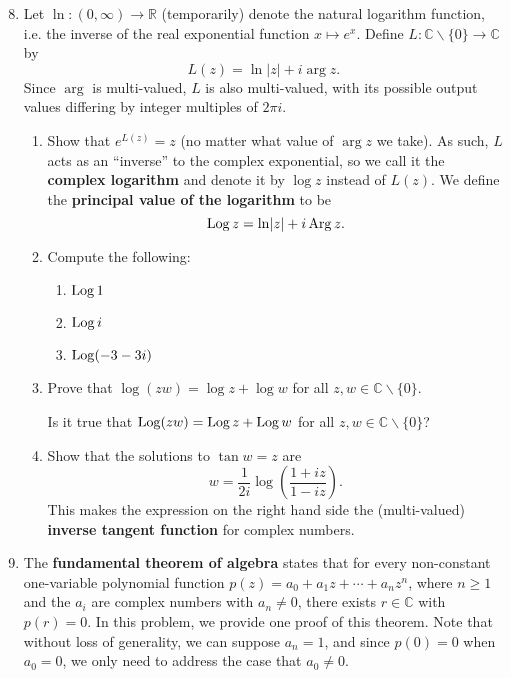 \begin{enumerate}\setcounter{enumi}{7}
\item Let $\ln:(0,\infty)\to\mathbb{R}$ (temporarily) denote the natural logarithm function, i.e. the inverse of the real exponential function $x\mapsto e^x$. Define $L:\mathbb{C}\backslash\{0\}\to\mathbb{C}$ by
\begin{equation*}
L(z) = \ln\lvert z\rvert + i\arg z.
\end{equation*}
Since $\arg$ is multi-valued, $L$ is also multi-valued, with its possible output values differing by integer multiples of $2\pi i$.
\begin{enumerate}
\item Show that $e^{L(z)} = z$ (no matter what value of $\arg z$ we take). As such, $L$ acts as an ``inverse'' to the complex exponential, so we call it the \textbf{complex logarithm} and denote it by $\log z$ instead of $L(z)$. We define the \textbf{principal value of the logarithm} to be
\begin{equation*}
\operatorname{Log} z = \ln\lvert z\rvert + i\operatorname{Arg} z.
\end{equation*}
\item Compute the following:
\begin{enumerate}
\item $\operatorname{Log} 1$
\item $\operatorname{Log} i$
\item $\operatorname{Log} (-3 - 3i)$
\end{enumerate}
\item Prove that $\log(zw) = \log z + \log w$ for all $z,w\in\mathbb{C}\backslash\{0\}$.\par
Is it true that $\operatorname{Log}(zw) = \operatorname{Log} z + \operatorname{Log} w$ for all $z,w\in\mathbb{C}\backslash\{0\}$?
\item Show that the solutions to $\tan w = z$ are
\begin{equation*}
w = \frac{1}{2i}\log\left(\frac{1 + iz}{1 - iz}\right).
\end{equation*}
This makes the expression on the right hand side the (multi-valued) \textbf{inverse tangent function} for complex numbers.
\end{enumerate}
\item The \textbf{fundamental theorem of algebra} states that for every non-constant one-variable polynomial function $p(z) = a_0 + a_1z + \cdots + a_nz^n$, where $n\geq 1$ and the $a_i$ are complex numbers with $a_n\neq 0$, there exists $r\in\mathbb{C}$ with $p(r) = 0$. In this problem, we provide one proof of this theorem. Note that without loss of generality, we can suppose $a_n = 1$, and since $p(0) = 0$ when $a_0 = 0$, we only need to address the case that $a_0\neq 0$.

\end{enumerate}
